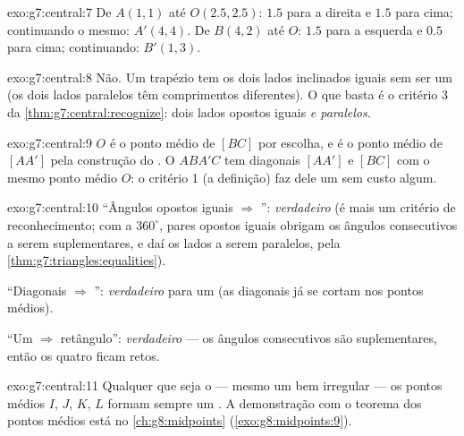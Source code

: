 \begin{solution}{exo:g7:central:7}
De $A(1,1)$ até $O(2.5, 2.5)$: $1.5$ para a direita e $1.5$ para cima;
continuando o mesmo: $A'(4, 4)$. De $B(4,2)$ até $O$: $1.5$ para a
esquerda e $0.5$ para cima; continuando: $B'(1, 3)$.
\end{solution}

\begin{solution}{exo:g7:central:8}
Não. Um trapézio  tem os dois lados inclinados iguais sem ser
um  (os dois lados paralelos têm comprimentos diferentes).
O que basta é o critério 3 da \cref{thm:g7:central:recognize}: dois
lados opostos iguais \emph{e paralelos}.
\end{solution}

\begin{solution}{exo:g7:central:9}
$O$ é o ponto médio de $[BC]$ por escolha, e é o ponto médio de $[AA']$
pela construção do . O  $ABA'C$ tem diagonais
$[AA']$ e $[BC]$ com o mesmo ponto médio $O$: o critério 1 (a
definição) faz dele um  sem custo algum.
\end{solution}

\begin{solution}{exo:g7:central:10}
``Ângulos opostos iguais $\Rightarrow$ '':
\emph{verdadeiro} (é mais um critério de reconhecimento; com a 
$360^\circ$, pares opostos iguais obrigam os ângulos consecutivos a
serem suplementares, e daí os lados a serem paralelos, pela
\cref{thm:g7:triangles:equalities}).

``Diagonais  $\Rightarrow$ '': \emph{verdadeiro}
para um  (as diagonais já se cortam nos pontos médios).

``Um  $\Rightarrow$ retângulo'': \emph{verdadeiro} --- os
ângulos consecutivos são suplementares, então os quatro ficam retos.
\end{solution}

\begin{solution}{exo:g7:central:11}
Qualquer que seja o  --- mesmo um bem irregular --- os
pontos médios $I$, $J$, $K$, $L$ formam sempre um
\emph{}. A demonstração com o teorema dos pontos médios
está no \cref{ch:g8:midpoints} (\cref{exo:g8:midpoints:9}).
\end{solution}

